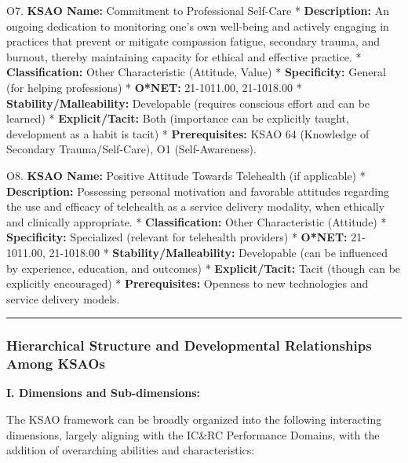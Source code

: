\documentclass[
  letterpaper,
  DIV=11,
  numbers=noendperiod]{scrartcl}
\begin{document}
O7. \textbf{KSAO Name:} Commitment to Professional Self-Care *
\textbf{Description:} An ongoing dedication to monitoring one's own
well-being and actively engaging in practices that prevent or mitigate
compassion fatigue, secondary trauma, and burnout, thereby maintaining
capacity for ethical and effective practice. * \textbf{Classification:}
Other Characteristic (Attitude, Value) * \textbf{Specificity:} General
(for helping professions) * \textbf{O*NET:} 21-1011.00, 21-1018.00 *
\textbf{Stability/Malleability:} Developable (requires conscious effort
and can be learned) * \textbf{Explicit/Tacit:} Both (importance can be
explicitly taught, development as a habit is tacit) *
\textbf{Prerequisites:} KSAO 64 (Knowledge of Secondary
Trauma/Self-Care), O1 (Self-Awareness).

O8. \textbf{KSAO Name:} Positive Attitude Towards Telehealth (if
applicable) * \textbf{Description:} Possessing personal motivation and
favorable attitudes regarding the use and efficacy of telehealth as a
service delivery modality, when ethically and clinically appropriate. *
\textbf{Classification:} Other Characteristic (Attitude) *
\textbf{Specificity:} Specialized (relevant for telehealth providers) *
\textbf{O*NET:} 21-1011.00, 21-1018.00 *
\textbf{Stability/Malleability:} Developable (can be influenced by
experience, education, and outcomes) * \textbf{Explicit/Tacit:} Tacit
(though can be explicitly encouraged) * \textbf{Prerequisites:} Openness
to new technologies and service delivery models.

\begin{center}\rule{0.5\linewidth}{0.5pt}\end{center}

\subsubsection{Hierarchical Structure and Developmental Relationships
Among
KSAOs}\label{hierarchical-structure-and-developmental-relationships-among-ksaos}

\textbf{I. Dimensions and Sub-dimensions:}

The KSAO framework can be broadly organized into the following
interacting dimensions, largely aligning with the IC\&RC Performance
Domains, with the addition of overarching abilities and characteristics:
\end{document}
